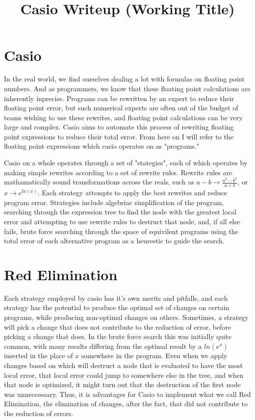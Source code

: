\documentclass{article}
\title{Casio Writeup (Working Title)}
\newcommand{\lnexp}[1]{ln\left(e^{#1}\right)}
\begin{document}
\maketitle

\section{Casio}

In the real world, 
we find ourselves dealing a lot with formulas 
on floating point numbers. 
And as programmers, 
we know that these floating point calculations 
are inherently inprecise. 
Programs can be rewritten by an expert to reduce their floating point error, 
but such numerical experts are often out of the budget of teams wishing to use these rewrites, 
and floating point calculations can be very large and complex. 
Casio aims to automate this process of rewriting floating point expressions 
to reduce their total error. 
From here on I will refer to the floating point expressions 
which casio operates on 
as "programs."

Casio on a whole operates through a set of "stategies", 
each of which operates by making simple rewrites according to a set of rewrite rules. 
Rewrite rules are mathamatically sound transformations across the reals, 
such as $a - b \to \frac{a^2 - b^2}{a + b}$, 
or $x \to e^{ln(x)}$. 
Each strategy attempts to apply the best rewrites 
and reduce program error. 
Strategies include algebriac simplification of the program, 
searching through the expression tree to find the node with the greatest local error 
and attempting to use rewrite rules to destruct that node, 
and, if all else fails, 
brute force searching through the space of equivilent programs 
using the total error of each alternative program 
as a heurestic to guide the search.

\section{Red Elimination}

Each strategy employed by casio 
has it's own merits and pitfalls, 
and each strategy has the potential 
to produce the optimal set of changes on certain programs, 
while producing non-optimal changes on others. 
Sometimes, a strategy will pick a change 
that does not contribute to the reduction of error, 
before picking a change that does. 
In the brute force search this was initially quite common, 
with many results differing from the optimal result 
by a $\lnexp{x}$ inserted in the place of $x$ 
somewhere in the program. 
Even when we apply changes based on which will destruct a node 
that is evaluated to have the most local error, 
that local error could jump to somewhere else in the tree, 
and when that node is optimized, 
it might turn out that the destruction of the first node was unneccessary. 
Thus, it is advantages for Casio 
to implement what we call Red Elimination, 
the elimination of changes, after the fact, 
that did not contribute to the reduction of errors.
\end{document}
